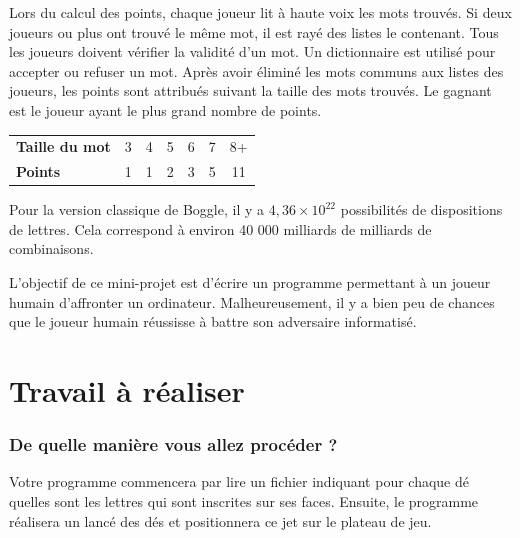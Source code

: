 \documentclass[10pt]{article}
\begin{document}

Lors du calcul des points, chaque joueur lit à haute voix les mots trouvés. Si deux joueurs
ou plus ont trouvé le même mot, il est rayé des listes le contenant. Tous les joueurs doivent
vérifier la validité d'un mot. Un dictionnaire est utilisé pour accepter ou refuser un mot. Après
avoir éliminé les mots communs aux listes des joueurs, les points sont attribués suivant
la taille des mots trouvés. Le gagnant est le joueur ayant le plus grand nombre de points.

\begin{center}
\begin{tabular}{lcccccc}
\hline
\bf Taille du mot & 3 & 4 & 5 & 6 & 7 & 8+ \\ 
\bf Points        & 1 & 1 & 2 & 3 & 5 & 11 \\
\hline
\end{tabular}
\end{center}

Pour la version classique de Boggle, il y a $4,36 \times 10^{22}$ possibilités de dispositions
de lettres. Cela correspond à environ 40 000 milliards de milliards de combinaisons.

\bigskip
L'objectif de ce mini-projet est d'écrire un programme permettant à un joueur humain d'affronter
un ordinateur. Malheureusement, il y a bien peu de chances que le joueur humain réussisse à battre
son adversaire informatisé.


\section*{Travail à réaliser}

\subsubsection*{De quelle manière vous allez procéder ?}

Votre programme commencera par lire un fichier indiquant pour chaque dé
quelles sont les lettres qui sont inscrites sur ses faces. Ensuite, le
programme réalisera un lancé des dés et positionnera ce jet sur le plateau de
jeu.
\end{document}
